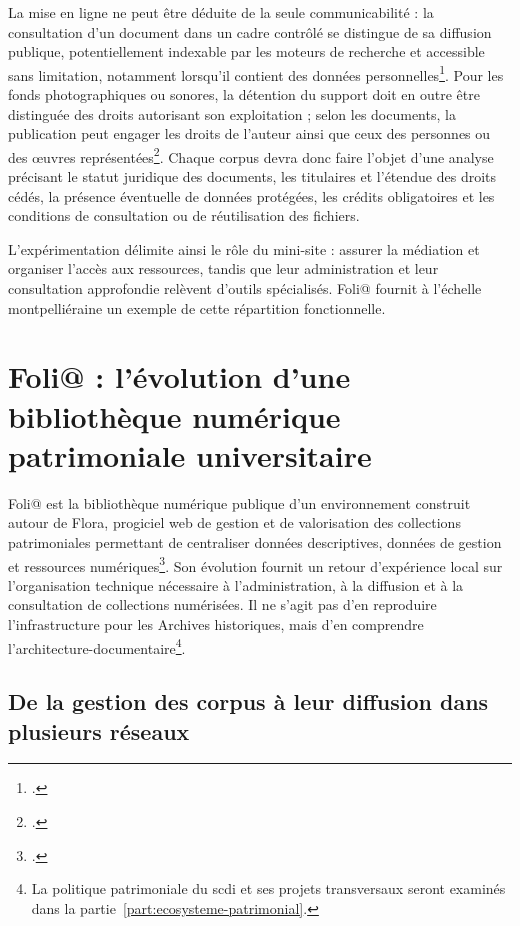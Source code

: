 La mise en ligne ne peut être déduite de la seule communicabilité : la consultation d'un document dans un cadre contrôlé se distingue de sa diffusion publique, potentiellement indexable par les moteurs de recherche et accessible sans limitation, notamment lorsqu'il contient des données personnelles\footcite[pp.~99--101]{MalletPoujol2009}. Pour les fonds photographiques ou sonores, la détention du support doit en outre être distinguée des droits autorisant son exploitation ; selon les documents, la publication peut engager les droits de l'auteur ainsi que ceux des personnes ou des œuvres représentées\footcite[pp.~71--76]{Dieuzeide1998}. Chaque corpus devra donc faire l'objet d'une analyse précisant le statut juridique des documents, les titulaires et l'étendue des droits cédés, la présence éventuelle de données protégées, les crédits obligatoires et les conditions de consultation ou de réutilisation des fichiers.

L'expérimentation délimite ainsi le rôle du mini-site : assurer la médiation et organiser l'accès aux ressources, tandis que leur administration et leur consultation approfondie relèvent d'outils spécialisés. Foli@ fournit à l'échelle montpelliéraine un exemple de cette répartition fonctionnelle.


\section{Foli@ : l'évolution d'une bibliothèque numérique patrimoniale universitaire}
\label{sec:retour-experience-folia}

Foli@ est la bibliothèque numérique publique d'un environnement construit autour de Flora, progiciel web de gestion et de valorisation des collections patrimoniales permettant de centraliser données descriptives, données de gestion et ressources numériques\footcite{FloraLogicielGestion}. Son évolution fournit un retour d'expérience local sur l'organisation technique nécessaire à l'administration, à la diffusion et à la consultation de collections numérisées. Il ne s'agit pas d'en reproduire l'infrastructure pour les Archives historiques, mais d'en comprendre l'\gls{architecture-documentaire}\footnote{La politique patrimoniale du \gls{scdi} et ses projets transversaux seront examinés dans la partie~\ref{part:ecosysteme-patrimonial}.}.


\subsection{De la gestion des corpus à leur diffusion dans plusieurs réseaux}

